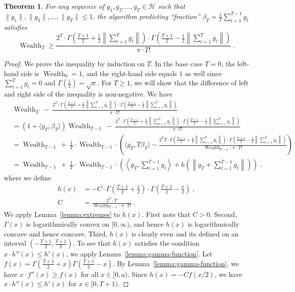 \documentclass{article}
\DeclareMathOperator{\Wealth}{Wealth}
\renewcommand{\H}{\mathcal{H}}
\newtheorem{theorem}{Theorem}
\begin{document}
\begin{theorem}
For any sequence of $g_1, g_2, \dots, g_T \in \H$ such that $\|g_1\|, \|g_2\|,
\dots, \|g_T\| \le 1$, the algorithm predicting ``fraction'' $\beta_T =
\frac{1}{T} \sum_{t=1}^{T-1} g_t$ satisfies
$$
\Wealth_T
\ge
\frac{2^T \cdot \Gamma \left(\frac{T+1}{2} + \frac{1}{2}\left\|\sum_{t=1}^T g_t \right\| \right) \cdot \Gamma \left(\frac{T+1}{2} - \frac{1}{2} \left\|\sum_{t=1}^T g_t \right\| \right)}{\pi \cdot T!}
\; .
$$
\end{theorem}

\begin{proof}
We prove the inequality by induction on $T$. In the base case $T=0$, the
left-hand side is $\Wealth_0 = 1$, and the right-hand side equals $1$ as well
since $\sum_{t=1}^T g_t = 0$ and $\Gamma(\frac{1}{2}) = \sqrt{\pi}$. For $T \ge
1$, we will show that the difference of left and right side of the inequality is
non-negative. We have
\begin{align*}
& \Wealth_T \ - \ \frac{2^T \cdot \Gamma \left(\frac{T+1}{2} + \frac{1}{2}\left\|\sum_{t=1}^T g_t \right\| \right) \cdot \Gamma \left(\frac{T+1}{2} - \frac{1}{2} \left\|\sum_{t=1}^T g_t \right\| \right)}{\pi \cdot T!} \\
& = (1 + \langle g_T, \beta_T \rangle) \Wealth_{T-1} \ - \ \frac{2^T \cdot \Gamma \left(\frac{T+1}{2} + \frac{1}{2}\left\|\sum_{t=1}^T g_t \right\| \right) \cdot \Gamma \left(\frac{T+1}{2} - \frac{1}{2} \left\|\sum_{t=1}^T g_t \right\| \right)}{\pi \cdot T!} \\
& = \Wealth_{T-1} \ + \ \frac{1}{T} \cdot \Wealth_{T-1} \cdot \left(\langle g_T, T \beta_T \rangle - \frac{2^T T \cdot \Gamma \left(\frac{T+1}{2} + \frac{1}{2}\left\|\sum_{t=1}^T g_t \right\| \right) \cdot \Gamma \left(\frac{T+1}{2} - \frac{1}{2} \left\|\sum_{t=1}^T g_t \right\| \right)}{\Wealth_{T-1} \cdot \pi \cdot T!} \right) \\
& = \Wealth_{T-1} \ + \ \frac{1}{T} \cdot \Wealth_{T-1} \cdot \left( \left\langle g_T, \sum_{t=1}^{T-1} g_t \right\rangle + h\left( \left\|g_T + \sum_{t=1}^{T-1} g_t \right\| \right) \right) \; .
\end{align*}
where we define
\begin{align*}
h(x) & = - C \cdot \Gamma \left(\frac{T+1}{2} + \frac{x}{2} \right) \cdot \Gamma \left(\frac{T+1}{2} - \frac{x}{2} \right) \; ,  \\
C & = \frac{2^T \cdot T}{\Wealth_{T-1} \cdot \pi \cdot T!} \; .
\end{align*}
We apply Lemma~\ref{lemma:extremes} to $h(x)$. First note that $C > 0$. Second,
$\Gamma(x)$ is logarithmically convex on $[0,\infty)$, and hence $h(x)$ is
logarithmically concave and hence concave. Third, $h(x)$ is clearly even and its
defined on an interval $(-\frac{T+1}{2}, \frac{T+1}{2})$. To see that $h(x)$
satisfies the condition $x \cdot h''(x) \le h'(x)$, we apply
Lemma~\ref{lemma:gamma-function}. Let $f(x) = \Gamma(\frac{T+1}{2}+x)
\Gamma(\frac{T+1}{2}-x)$. By Lemma~\ref{lemma:gamma-function}, we have $x \cdot
f''(x) \ge f(x)$ for all $x \in [0,a)$. Since $h(x) = - C f(x/2)$, we have $x
\cdot h''(x) \le h'(x)$ for $x \in [0,T+1)$.


\end{proof}
\end{document}
